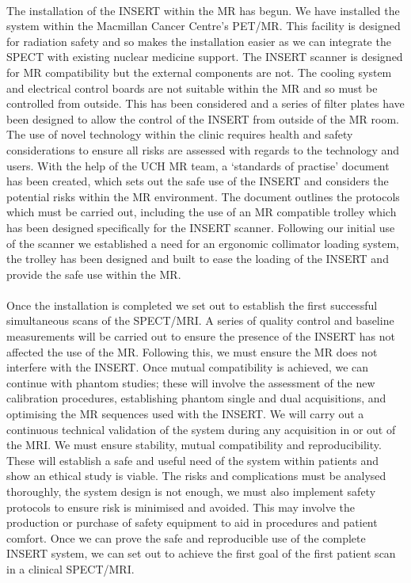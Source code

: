 \paragraph{}
The installation of the \acrshort{INSERT} within the \acrshort{MR} has begun. We have installed the system within the Macmillan Cancer Centre's \acrshort{PET/MR}. This facility is designed for radiation safety and so makes the installation easier as we can integrate the \acrshort{SPECT} with existing nuclear medicine support. The \acrshort{INSERT} scanner is designed for \acrshort{MR} compatibility but the external components are not. The cooling system and electrical control boards are not suitable within the \acrshort{MR} and so must be controlled from outside. This has been considered and a series of filter plates have been designed to allow the control of the \acrshort{INSERT} from outside of the \acrshort{MR} room. The use of novel technology within the clinic requires health and safety considerations to ensure all risks are assessed with regards to the technology and users. With the help of the \acrshort{UCH} \acrshort{MR} team, a `standards of practise' document has been created, which sets out the safe use of the \acrshort{INSERT} and considers the potential risks within the \acrshort{MR} environment. The document outlines the protocols which must be carried out, including the use of an \acrshort{MR} compatible trolley which has been designed specifically for the \acrshort{INSERT} scanner. Following our initial use of the scanner we established a need for an ergonomic collimator loading system, the trolley has been designed and built to ease the loading of the \acrshort{INSERT} and provide the safe use within the \acrshort{MR}. 
\paragraph{}
Once the installation is completed we set out to establish the first successful simultaneous scans of the \acrshort{SPECT/MRI}. A series of quality control and baseline measurements will be carried out to ensure the presence of the \acrshort{INSERT} has not affected the use of the \acrshort{MR}. Following this, we must ensure the \acrshort{MR} does not interfere with the \acrshort{INSERT}. Once mutual compatibility is achieved, we can continue with phantom studies; these will involve the assessment of the new calibration procedures, establishing phantom single and dual acquisitions, and optimising the \acrshort{MR} sequences used with the \acrshort{INSERT}. We will carry out a continuous technical validation of the system during any acquisition in or out of the \acrshort{MRI}. We must ensure stability, mutual compatibility and reproducibility. These will establish a safe and useful need of the system within patients and show an ethical study is viable. The risks and complications must be analysed thoroughly, the system design is not enough, we must also implement safety protocols to ensure risk is minimised and avoided. This may involve the production or purchase of safety equipment to aid in procedures and patient comfort. Once we can prove the safe and reproducible use of the complete \acrshort{INSERT} system, we can set out to achieve the first goal of the first patient scan in a clinical \acrshort{SPECT/MRI}.